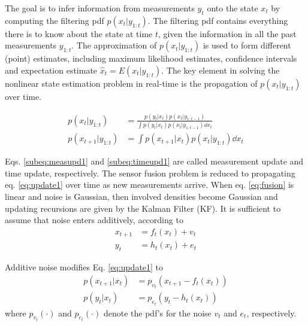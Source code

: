 The goal is to infer information from measurements $ y_{t} $ onto the state $ x_{t} $ by computing the filtering pdf $ p ( x_{t} | y_{1:t} ) $.  The filtering pdf contains everything there is to know about the state at time $ t $, given the information in all the past measurements $ y_{1:t} $. The approximation of $ p ( x_{t} | y_{1:t} ) $ is used to form different (point) estimates, including maximum likelihood estimates, confidence intervals and expectation estimate $ \hat{x}_{t} = E( x_{t} | y_{1:t} ) $. The key element in solving the nonlinear state estimation problem in real-time is the propagation of $ p ( x_{t} | y_{1:t} ) $ over time. 

\begin{subequations}\label{eq:update1} \begin{align}
	p ( x_{t} | y_{1:t} ) &= \frac { p ( y_{t} | x_{t} ) p ( x_{t} | y_{1:t-1} ) } { \int p ( y_{t} | x_{t} ) p ( x_{t} | y_{1:t-1} ) \dd{x_{t}} } \label{subeq:measupd1}\\
	p ( x_{t+1} | y_{1:t} ) &= \int p ( x_{t+1} | x_{t} ) p ( x_{t} | y_{1:t} ) \dd{x_{t}} \label{subeq:timeupd1}
\end{align} \end{subequations}

Eqs. \ref{subeq:measupd1} and \ref{subeq:timeupd1}  are called measurement update and time update, respectively.  The sensor fusion problem is reduced to propagating eq. \ref{eq:update1} over time as new measurements arrive. When eq. \ref{eq:fusion} is linear and noise is Gaussian, then involved densities become Gaussian and updating recursions are given by the Kalman Filter (KF). It is sufficient to assume that noise enters additively, according to
\begin{subequations} \begin{align}
	x_{t+1} &= f_{t} ( x_{t} ) + v_{t} \\
	y_{t} &= h_{t} ( x_{t} ) + e_{t}
\end{align} \end{subequations}

\noindent Additive noise modifies Eq. \ref{eq:update1} to
\begin{subequations} \begin{align}
	p ( x_{t+1} | x_{t} ) &= p_{v_{t}} ( x_{t+1} - f_{t} ( x_{t} ) ) \\
	p ( y_{t} | x_{t} ) &= p_{e_{t}} ( y_{t} - h_{t} ( x_{t} ) )
\end{align} \end{subequations}
where $ p_{v_{t}} (\cdot) $ and $ p_{e_{t}} (\cdot) $ denote the pdf's for the noise $ v_{t} $ and $ e_{t} $, respectively.

